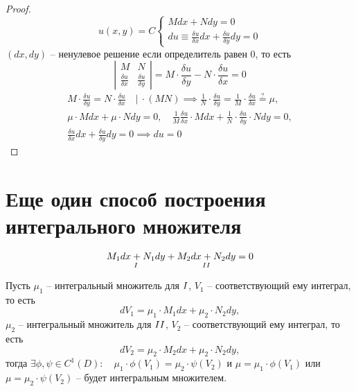 \documentclass{report}
\theoremstyle{definition}
\newcommand{\RomanNumeralCaps}[1]{\MakeUppercase{\romannumeral #1}}
\begin{document}
\begin{proof}
    \begin{equation*}
        u(x,y) = C\left\{\begin{array}{l}
            Mdx + Ndy = 0 \\
            du \equiv \frac{\delta u}{\delta x}dx + \frac{\delta u}{\delta y}dy = 0
        \end{array}\right.
    \end{equation*}
    $(dx,dy)$ -- ненулевое решение если определитель равен 0, то есть
    \begin{equation*}
        \left|\begin{array}{cc}
            M                         & N                         \\
            \frac{\delta u}{\delta x} & \frac{\delta u}{\delta y}
        \end{array}\right| = M\cdot \frac{\delta u}{\delta y} - N\cdot \frac{\delta u}{\delta x} = 0
    \end{equation*}
    \begin{multline*}
        M\cdot \frac{\delta u}{\delta y} = N\cdot \frac{\delta u}{\delta x} \quad \bigg| \ \cdot (MN) \implies \frac{1}{N}\cdot \frac{\delta u}{\delta y} = \frac{1}{M} \cdot \frac{\delta u}{\delta x} \overset{?}{=} \mu, \\
        \mu \cdot Mdx + \mu \cdot Ndy = 0, \quad \frac{1}{M} \frac{\delta u}{\delta x} \cdot Mdx + \frac{1}{N} \cdot \frac{\delta u}{\delta y} \cdot Ndy = 0, \\
        \frac{\delta u}{\delta x}dx + \frac{\delta u}{\delta y}dy = 0 \implies du = 0
    \end{multline*}
\end{proof}

\section*{Еще один способ построения интегрального множителя}
\begin{equation*}
    \underset{\RomanNumeralCaps{1}}{M_1dx + N_1dy} + \underset{\RomanNumeralCaps{2}}{M_2dx + N_2dy} = 0
\end{equation*}

Пусть $\mu_1$ -- интегральный множитель для $\RomanNumeralCaps{1}$, $V_1$ -- соответствующий ему интеграл, то есть
\begin{equation*}
    dV_1 = \mu_1 \cdot M_1 dx + \mu_2 \cdot N_2 dy,
\end{equation*}
$\mu_2$ -- интегральный множитель для $\RomanNumeralCaps{2}$, $V_2$ -- соответствующий ему интеграл, то есть
\begin{equation*}
    dV_2 = \mu_2 \cdot M_2 dx + \mu_2 \cdot N_2 dy,
\end{equation*}
тогда $\exists \phi,\psi \in C^1(D): \quad \mu_1 \cdot \phi(V_1) = \mu_2 \cdot \psi(V_2)$ и $\mu = \mu_1 \cdot \phi (V_1)$ или $\mu = \mu_2 \cdot \psi(V_2)$ -- будет интегральным множителем.
\end{document}
